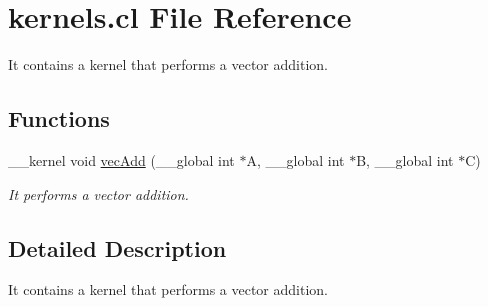 \hypertarget{kernels_8cl}{}\section{kernels.\+cl File Reference}
\label{kernels_8cl}


It contains a kernel that performs a vector addition.  


\subsection*{Functions}
\begin{DoxyCompactItemize}
\item 
\+\_\+\+\_\+kernel void \hyperlink{kernels_8cl_a15fe8af998456b32910ce0c06f12a87e}{vec\+Add} (\+\_\+\+\_\+global int $\ast$A, \+\_\+\+\_\+global int $\ast$B, \+\_\+\+\_\+global int $\ast$C)
\begin{DoxyCompactList}\small\item\em It performs a vector addition. \end{DoxyCompactList}\end{DoxyCompactItemize}


\subsection{Detailed Description}
It contains a kernel that performs a vector addition. 

